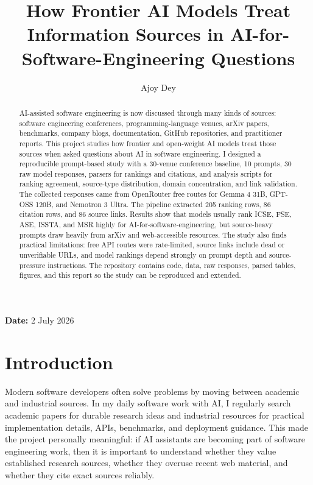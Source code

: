 \documentclass[acmsmall,review,nonacm]{acmart}
\begin{document}
\title[How AI Models Treat Sources in AI-for-SE Questions]%
{How Frontier AI Models Treat Information Sources in AI-for-Software-Engineering Questions}

\author{Ajoy Dey}
\email{}

\begin{abstract}
AI-assisted software engineering is now discussed through many kinds of
sources: software engineering conferences, programming-language venues, arXiv
papers, benchmarks, company blogs, documentation, GitHub repositories, and
practitioner reports. This project studies how frontier and open-weight AI
models treat those sources when asked questions about AI in software
engineering. I designed a reproducible prompt-based study with a 30-venue
conference baseline, 10 prompts, 30 raw model responses, parsers for rankings
and citations, and analysis scripts for ranking agreement, source-type
distribution, domain concentration, and link validation. The collected
responses came from OpenRouter free routes for Gemma 4 31B, GPT-OSS 120B, and
Nemotron 3 Ultra. The pipeline extracted 205 ranking rows, 86 citation rows,
and 86 source links. Results show that models usually rank ICSE, FSE, ASE,
ISSTA, and MSR highly for AI-for-software-engineering, but source-heavy prompts
draw heavily from arXiv and web-accessible resources. The study also finds
practical limitations: free API routes were rate-limited, source links include
dead or unverifiable URLs, and model rankings depend strongly on prompt depth
and source-pressure instructions. The repository contains code, data, raw
responses, parsed tables, figures, and this report so the study can be
reproduced and extended.
\end{abstract}

\maketitle

\noindent\textbf{Date:} 2 July 2026

\section{Introduction}

Modern software developers often solve problems by moving between academic and
industrial sources. In my daily software work with AI, I regularly search
academic papers for durable research ideas and industrial resources for
practical implementation details, APIs, benchmarks, and deployment guidance.
This made the project personally meaningful: if AI assistants are becoming
part of software engineering work, then it is important to understand whether
they value established research sources, whether they overuse recent web
material, and whether they cite exact sources reliably.
\end{document}
